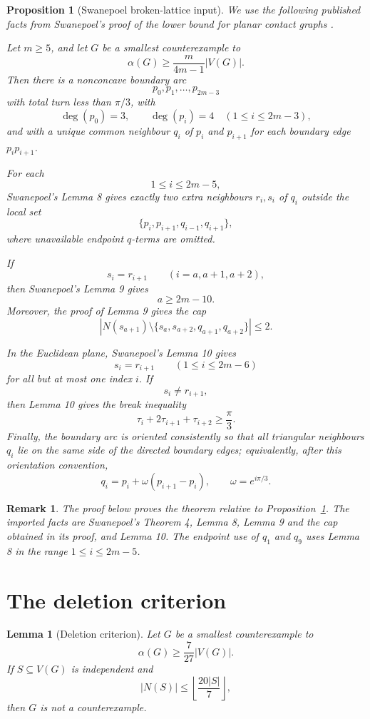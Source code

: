 \documentclass[11pt]{article}
\newtheorem{lemma}[theorem]{Lemma}
\newtheorem{proposition}[theorem]{Proposition}
\newtheorem{remark}[theorem]{Remark}
\begin{document}
\begin{proposition}[Swanepoel broken-lattice input]\label{prop:SwanepoelInput}
We use the following published facts from Swanepoel's proof of the lower bound for planar contact graphs \cite{Swanepoel2002}.

Let $m\ge 5$, and let $G$ be a smallest counterexample to
\[
 \alpha(G)\ge \frac{m}{4m-1}|V(G)|.
\]
Then there is a nonconcave boundary arc
\[
 p_0,p_1,\ldots,p_{2m-3}
\]
with total turn less than $\pi/3$, with
\[
 \deg(p_0)=3,
 \qquad
 \deg(p_i)=4\quad(1\le i\le 2m-3),
\]
and with a unique common neighbour $q_i$ of $p_i$ and $p_{i+1}$ for each boundary edge $p_ip_{i+1}$.

For each
\[
 1\le i\le 2m-5,
\]
Swanepoel's Lemma 8 gives exactly two extra neighbours $r_i,s_i$ of $q_i$ outside the local set
\[
 \{p_i,p_{i+1},q_{i-1},q_{i+1}\},
\]
where unavailable endpoint $q$-terms are omitted.

If
\[
 s_i=r_{i+1}\qquad(i=a,a+1,a+2),
\]
then Swanepoel's Lemma 9 gives
\[
 a\ge 2m-10.
\]
Moreover, the proof of Lemma 9 gives the cap
\[
 \left|N(s_{a+1})\setminus\{s_a,s_{a+2},q_{a+1},q_{a+2}\}\right|\le 2.
\]

In the Euclidean plane, Swanepoel's Lemma 10 gives
\[
 s_i=r_{i+1}\qquad(1\le i\le 2m-6)
\]
for all but at most one index $i$. If
\[
 s_i\ne r_{i+1},
\]
then Lemma 10 gives the break inequality
\[
 \tau_i+2\tau_{i+1}+\tau_{i+2}\ge \frac{\pi}{3}.
\]
Finally, the boundary arc is oriented consistently so that all triangular neighbours $q_i$ lie on the same side of the directed boundary edges; equivalently, after this orientation convention,
\[
 q_i=p_i+\omega(p_{i+1}-p_i),
 \qquad \omega=e^{i\pi/3}.
\]
\end{proposition}

\begin{remark}
The proof below proves the theorem relative to Proposition~\ref{prop:SwanepoelInput}. The imported facts are Swanepoel's Theorem 4, Lemma 8, Lemma 9 and the cap obtained in its proof, and Lemma 10. The endpoint use of $q_1$ and $q_9$ uses Lemma 8 in the range $1\le i\le 2m-5$.
\end{remark}

\section{The deletion criterion}

\begin{lemma}[Deletion criterion]\label{lem:deletion}
Let $G$ be a smallest counterexample to
\[
 \alpha(G)\ge \frac{7}{27}|V(G)|.
\]
If $S\subseteq V(G)$ is independent and
\[
 |N(S)|\le \left\lfloor\frac{20|S|}{7}\right\rfloor,
\]
then $G$ is not a counterexample.
\end{lemma}
\end{document}
